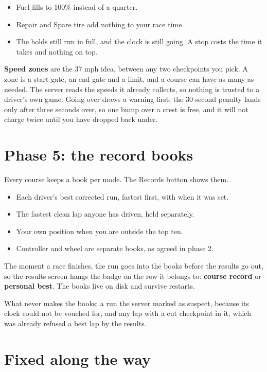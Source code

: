 \documentclass[11pt,a4paper]{article}
\begin{document}
\begin{itemize}
  \item Fuel fills to 100\% instead of a quarter.
  \item Repair and Spare tire add nothing to your race time.
  \item The holds still run in full, and the clock is still going. A stop
        costs the time it takes and nothing on top.
\end{itemize}

\textbf{Speed zones} are the 37 mph idea, between any two checkpoints you
pick. A zone is a start gate, an end gate and a limit, and a course can have
as many as needed. The server reads the speeds it already collects, so
nothing is trusted to a driver's own game. Going over draws a warning first;
the 30 second penalty lands only after three seconds over, so one bump over a
crest is free, and it will not charge twice until you have dropped back under.

\section{Phase 5: the record books}

Every course keeps a book per mode. The Records button shows them.

\begin{itemize}
  \item Each driver's best corrected run, fastest first, with when it was set.
  \item The fastest clean lap anyone has driven, held separately.
  \item Your own position when you are outside the top ten.
  \item Controller and wheel are separate books, as agreed in phase 2.
\end{itemize}

The moment a race finishes, the run goes into the books before the results go
out, so the results screen hangs the badge on the row it belongs to:
\textbf{course record} or \textbf{personal best}. The books live on disk and
survive restarts.

What never makes the books: a run the server marked as suspect, because its
clock could not be vouched for, and any lap with a cut checkpoint in it,
which was already refused a best lap by the results.

\section{Fixed along the way}
\end{document}
